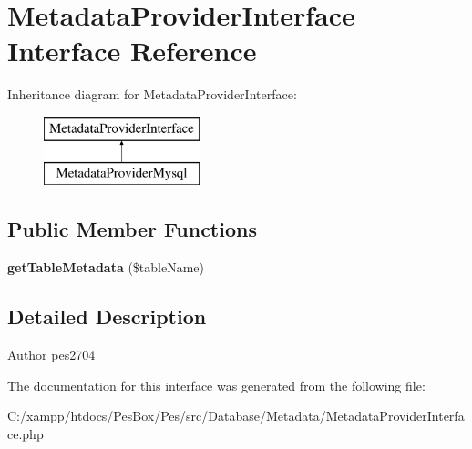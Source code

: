 \hypertarget{interface_pes_1_1_database_1_1_metadata_1_1_metadata_provider_interface}{}\section{Metadata\+Provider\+Interface Interface Reference}
\label{interface_pes_1_1_database_1_1_metadata_1_1_metadata_provider_interface}
Inheritance diagram for Metadata\+Provider\+Interface\+:\begin{figure}[H]
\begin{center}
\leavevmode
\includegraphics[height=2.000000cm]{interface_pes_1_1_database_1_1_metadata_1_1_metadata_provider_interface}
\end{center}
\end{figure}
\subsection*{Public Member Functions}
\begin{DoxyCompactItemize}
\item 
\mbox{\label{interface_pes_1_1_database_1_1_metadata_1_1_metadata_provider_interface_afa31de0e84c03f8daed9280bfa41a77f}} 
{\bfseries get\+Table\+Metadata} (\$table\+Name)
\end{DoxyCompactItemize}


\subsection{Detailed Description}
\begin{DoxyAuthor}{Author}
pes2704 
\end{DoxyAuthor}


The documentation for this interface was generated from the following file\+:\begin{DoxyCompactItemize}
\item 
C\+:/xampp/htdocs/\+Pes\+Box/\+Pes/src/\+Database/\+Metadata/Metadata\+Provider\+Interface.\+php\end{DoxyCompactItemize}

